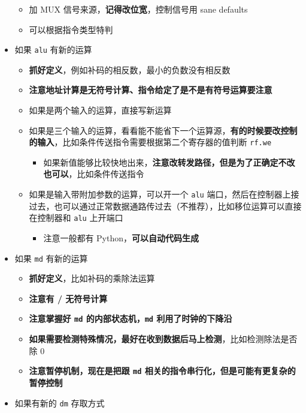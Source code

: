 \documentclass[12pt,AutoFakeBold,AutoFakeSlant]{article}
\providecommand{\tightlist}{%
  \setlength{\itemsep}{0pt}\setlength{\parskip}{0pt}}
\begin{document}
\begin{itemize}
  \begin{itemize}
  \tightlist
  \item
    加 MUX 信号来源，\textbf{记得改位宽}，控制信号用 sane defaults
  \item
    可以根据指令类型特判
  \end{itemize}
\item
  如果 \texttt{alu} 有新的运算

  \begin{itemize}
  \tightlist
  \item
    \textbf{抓好定义}，例如补码的相反数，最小的负数没有相反数
  \item
    \textbf{注意地址计算是无符号计算、指令给定了是不是有符号运算要注意}
  \item
    如果是两个输入的运算，直接写新运算
  \item
    如果是三个输入的运算，看看能不能省下一个运算源，\textbf{有的时候要改控制的输入}，比如条件传送指令需要根据第二个寄存器的值判断
    \texttt{rf.we}

    \begin{itemize}
    \tightlist
    \item
      如果新值能够比较快地出来，\textbf{注意改转发路径，但是为了正确定不改也可以}，比如条件传送指令
    \end{itemize}
  \item
    如果是输入带附加参数的运算，可以开一个 \texttt{alu}
    端口，然后在控制器上接过去，也可以通过正常数据通路传过去（不推荐），比如移位运算可以直接在控制器和
    \texttt{alu} 上开端口

    \begin{itemize}
    \tightlist
    \item
      注意一般都有 Python，\textbf{可以自动代码生成}
    \end{itemize}
  \end{itemize}
\item
  如果 \texttt{md} 有新的运算

  \begin{itemize}
  \tightlist
  \item
    \textbf{抓好定义}，比如补码的乘除法运算
  \item
    \textbf{注意有 / 无符号计算}
  \item
    \textbf{注意掌握好 \texttt{md} 的内部状态机，\texttt{md}
    利用了时钟的下降沿}
  \item
    \textbf{如果需要检测特殊情况，最好在收到数据后马上检测}，比如检测除法是否除
    0
  \item
    \textbf{注意暂停机制，现在是把跟 \texttt{md}
    相关的指令串行化，但是可能有更复杂的暂停控制}
  \end{itemize}
\item
  如果有新的 \texttt{dm} 存取方式


\end{itemize}
\end{document}
